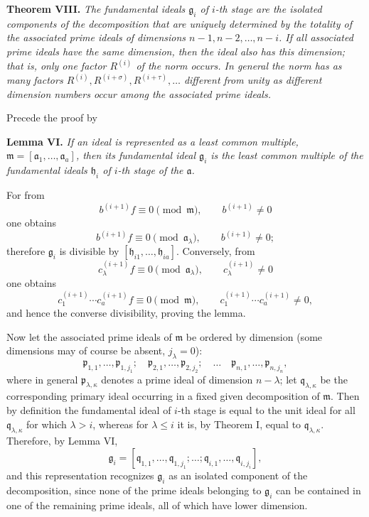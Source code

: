 \documentclass[11pt]{article}
\providecommand{\frakm}{\mathfrak m}
\providecommand{\frakp}{\mathfrak p}
\providecommand{\frakq}{\mathfrak q}
\providecommand{\fraka}{\mathfrak a}
\providecommand{\frakg}{\mathfrak g}
\providecommand{\frakh}{\mathfrak h}
\begin{document}
\textbf{Theorem VIII.} \emph{The fundamental ideals $\frakg_i$ of $i$-th stage are the isolated components of the decomposition that are uniquely determined by the totality of the associated prime ideals of dimensions $n-1,n-2,\ldots,n-i$. If all associated prime ideals have the same dimension, then the ideal also has this dimension; that is, only one factor $R^{(i)}$ of the norm occurs. In general the norm has as many factors $R^{(i)},R^{(i+\sigma)},R^{(i+\tau)},\ldots$ different from unity as different dimension numbers occur among the associated prime ideals.}

Precede the proof by

\textbf{Lemma VI.} \emph{If an ideal is represented as a least common multiple, $\frakm=[\fraka_1,\ldots,\fraka_a]$, then its fundamental ideal $\frakg_i$ is the least common multiple of the fundamental ideals $\frakh_i$ of $i$-th stage of the $\fraka$.}

For from
\[
 b^{(i+1)}f\equiv0\pmod{\frakm},\qquad b^{(i+1)}\ne0
\]
one obtains
\[
 b^{(i+1)}f\equiv0\pmod{\fraka_\lambda},\qquad b^{(i+1)}\ne0;
\]
therefore $\frakg_i$ is divisible by $[\frakh_{i1},\ldots,\frakh_{ia}]$. Conversely, from
\[
 c_\lambda^{(i+1)}f\equiv0\pmod{\fraka_\lambda},\qquad c_\lambda^{(i+1)}\ne0
\]
one obtains
\[
 c_1^{(i+1)}\cdots c_a^{(i+1)}f\equiv0\pmod{\frakm},\qquad
 c_1^{(i+1)}\cdots c_a^{(i+1)}\ne0,
\]
and hence the converse divisibility, proving the lemma.

Now let the associated prime ideals of $\frakm$ be ordered by dimension (some dimensions may of course be absent, $j_\lambda=0$):
\[
 \frakp_{1,1},\ldots,\frakp_{1,j_1};\quad
 \frakp_{2,1},\ldots,\frakp_{2,j_2};\quad \ldots\quad
 \frakp_{n,1},\ldots,\frakp_{n,j_n},
\]
where in general $\frakp_{\lambda,\kappa}$ denotes a prime ideal of dimension $n-\lambda$; let $\frakq_{\lambda,\kappa}$ be the corresponding primary ideal occurring in a fixed given decomposition of $\frakm$. Then by definition the fundamental ideal of $i$-th stage is equal to the unit ideal for all $\frakq_{\lambda,\kappa}$ for which $\lambda>i$, whereas for $\lambda\le i$ it is, by Theorem I, equal to $\frakq_{\lambda,\kappa}$. Therefore, by Lemma VI,
\[
 \tag{5}
 \frakg_i=[\frakq_{1,1},\ldots,\frakq_{1,j_1};\ldots;\frakq_{i,1},\ldots,\frakq_{i,j_i}],
\]
and this representation recognizes $\frakg_i$ as an isolated component of the decomposition, since none of the prime ideals belonging to $\frakg_i$ can be contained in one of the remaining prime ideals, all of which have lower dimension.
\end{document}
